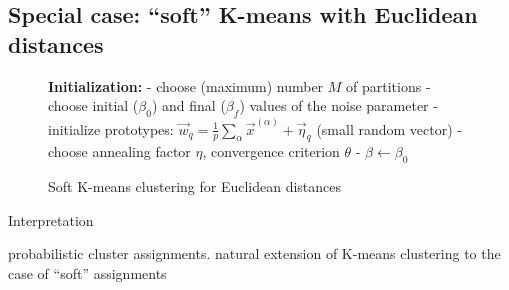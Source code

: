 \subsection{Special case: ``soft'' K-means with Euclidean distances}
\begin{frame}[shrink=18]%
\begin{figure}[!th]
\footnotesize
\removelatexerror
\begin{algorithm}[H]
  \DontPrintSemicolon
  \textbf{Initialization:}\;
 - choose (maximum) number $M$ of partitions\; 
- choose initial ($\beta_0$) and final ($\beta_f$) values of the noise parameter\;
- initialize prototypes:  $\vec{w}_q = \frac{1}{p} 
\sum\limits_{\alpha} \vec{x}^{(\alpha)} + \vec{\eta}_q$ (small random vector)\;
- choose annealing factor $\eta$, convergence criterion $\theta$\;
- $\beta \leftarrow \beta_0$\;
\label{alg:softKmeansEuclidean}
\caption{Soft K-means clustering for Euclidean distances}
\end{algorithm}
\end{figure}
\begin{block}{Interpretation}
\begin{itemize}
     \itl probabilistic cluster assignments.
	\itl natural extension of K-means clustering to the case of ``soft'' assignments
\end{itemize}
\end{block}
\end{frame}
